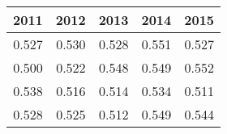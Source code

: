 \begin{tabular}{rrrrr}
\toprule
2011 & 2012 & 2013 & 2014 & 2015 \\
\midrule
0.527 & 0.530 & 0.528 & 0.551 & 0.527 \\
0.500 & 0.522 & 0.548 & 0.549 & 0.552 \\
0.538 & 0.516 & 0.514 & 0.534 & 0.511 \\
0.528 & 0.525 & 0.512 & 0.549 & 0.544 \\
\bottomrule
\end{tabular}

